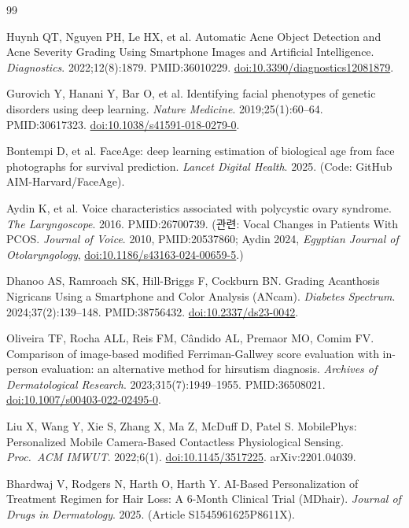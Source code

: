 \documentclass[11pt,a4paper]{article}
\begin{document}
\begin{thebibliography}{99}

 Huynh QT, Nguyen PH, Le HX, et al. Automatic Acne Object Detection and Acne Severity Grading Using Smartphone Images and Artificial Intelligence. \emph{Diagnostics}. 2022;12(8):1879. PMID:36010229. \href{https://doi.org/10.3390/diagnostics12081879}{doi:10.3390/diagnostics12081879}.

 Gurovich Y, Hanani Y, Bar O, et al. Identifying facial phenotypes of genetic disorders using deep learning. \emph{Nature Medicine}. 2019;25(1):60--64. PMID:30617323. \href{https://doi.org/10.1038/s41591-018-0279-0}{doi:10.1038/s41591-018-0279-0}.

 Bontempi D, et al. FaceAge: deep learning estimation of biological age from face photographs for survival prediction. \emph{Lancet Digital Health}. 2025. (Code: GitHub AIM-Harvard/FaceAge).

 Aydin K, et al. Voice characteristics associated with polycystic ovary syndrome. \emph{The Laryngoscope}. 2016. PMID:26700739. (관련: Vocal Changes in Patients With PCOS. \emph{Journal of Voice}. 2010, PMID:20537860; Aydin 2024, \emph{Egyptian Journal of Otolaryngology}, \href{https://doi.org/10.1186/s43163-024-00659-5}{doi:10.1186/s43163-024-00659-5}.)

 Dhanoo AS, Ramroach SK, Hill-Briggs F, Cockburn BN. Grading Acanthosis Nigricans Using a Smartphone and Color Analysis (ANcam). \emph{Diabetes Spectrum}. 2024;37(2):139--148. PMID:38756432. \href{https://doi.org/10.2337/ds23-0042}{doi:10.2337/ds23-0042}.

 Oliveira TF, Rocha ALL, Reis FM, C\^{a}ndido AL, Premaor MO, Comim FV. Comparison of image-based modified Ferriman-Gallwey score evaluation with in-person evaluation: an alternative method for hirsutism diagnosis. \emph{Archives of Dermatological Research}. 2023;315(7):1949--1955. PMID:36508021. \href{https://doi.org/10.1007/s00403-022-02495-0}{doi:10.1007/s00403-022-02495-0}.

 Liu X, Wang Y, Xie S, Zhang X, Ma Z, McDuff D, Patel S. MobilePhys: Personalized Mobile Camera-Based Contactless Physiological Sensing. \emph{Proc.\ ACM IMWUT}. 2022;6(1). \href{https://doi.org/10.1145/3517225}{doi:10.1145/3517225}. arXiv:2201.04039.

 Bhardwaj V, Rodgers N, Harth O, Harth Y. AI-Based Personalization of Treatment Regimen for Hair Loss: A 6-Month Clinical Trial (MDhair). \emph{Journal of Drugs in Dermatology}. 2025. (Article S1545961625P8611X).


\end{thebibliography}
\end{document}
